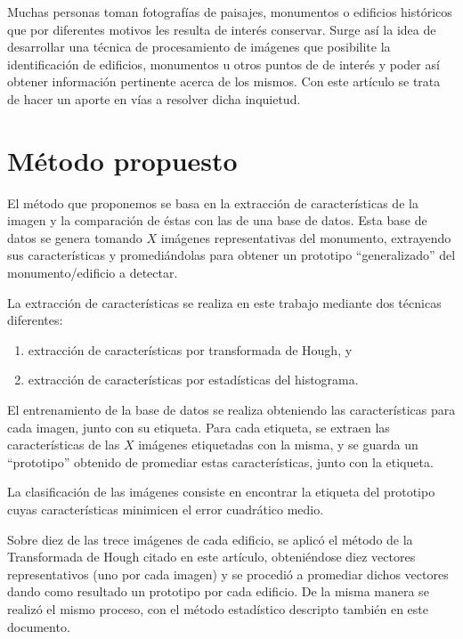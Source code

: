 \documentclass[conference,spanish,a4paper,10pt,oneside,final]{tfmpd}
\begin{document}
Muchas personas toman fotografías de paisajes, monumentos o edificios históricos
que por diferentes motivos les resulta de interés conservar.
Surge así la idea de desarrollar una técnica de procesamiento de imágenes
que posibilite la identificación de edificios, monumentos u otros puntos de
de interés y poder así obtener información pertinente
acerca de los mismos. Con este artículo se trata
de hacer un aporte en vías a resolver dicha inquietud.
%
%
%
%
\section{Método propuesto}
El método que proponemos se basa en la extracción de características de la
imagen y la comparación de éstas con las de una base de datos.
Esta base de datos se genera tomando $X$ imágenes representativas del monumento,
extrayendo sus características y promediándolas para obtener un prototipo
``generalizado'' del monumento/edificio a detectar.

La extracción de características se realiza en este trabajo mediante dos
técnicas diferentes:
\begin{enumerate}
\item extracción de características por transformada de Hough, y
\item extracción de características por estadísticas del histograma.
\end{enumerate}

El entrenamiento de la base de datos se realiza obteniendo las características
para cada imagen, junto con su etiqueta. Para cada etiqueta, se extraen las
características de las $X$ imágenes etiquetadas con la misma, y se guarda un
``prototipo'' obtenido de promediar estas características, junto con la
etiqueta.

La clasificación de las imágenes consiste en encontrar la etiqueta del
prototipo cuyas características minimicen el error cuadrático medio.

Sobre diez de las trece imágenes de cada edificio, se aplicó el método de la Transformada de Hough citado en este artículo, obteniéndose diez vectores representativos (uno por cada imagen) y se procedió a promediar dichos vectores dando como resultado un prototipo por cada edificio. De la misma manera se realizó el mismo proceso, con el método estadístico descripto también en este documento.

%
%
\end{document}
